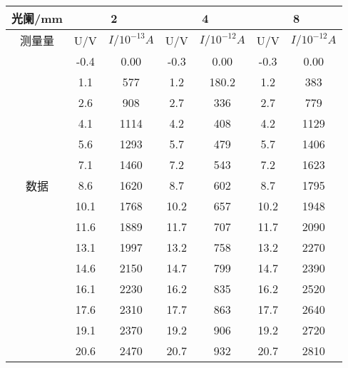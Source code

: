 \documentclass{article}
\begin{document}
\begin{table}[]
\centering
\caption{}
\label{tab:table2}
\begin{tabular}{@{}c|cc|cc|cc@{}}
\toprule
光阑/mm                & \multicolumn{2}{c|}{2} & \multicolumn{2}{c|}{4} & \multicolumn{2}{c}{8} \\ \midrule
测量量                  & U/V   & $I/10^{-13}A$ & U/V   & $I/10^{-12}A$  & U/V   & $I/10^{-12}A$  \\ \midrule
\multirow{13}{*}{数据} & -0.4  & 0.00          & -0.3  & 0.00           & -0.3  & 0.00           \\
                     & 1.1   & 577           & 1.2   & 180.2          & 1.2   & 383            \\
                     & 2.6   & 908           & 2.7   & 336            & 2.7   & 779            \\
                     & 4.1   & 1114          & 4.2   & 408            & 4.2   & 1129           \\
                     & 5.6   & 1293          & 5.7   & 479            & 5.7   & 1406           \\
                     & 7.1   & 1460          & 7.2   & 543            & 7.2   & 1623           \\
                     & 8.6   & 1620          & 8.7   & 602            & 8.7   & 1795           \\
                     & 10.1  & 1768          & 10.2  & 657            & 10.2  & 1948           \\
                     & 11.6  & 1889          & 11.7  & 707            & 11.7  & 2090           \\
                     & 13.1  & 1997          & 13.2  & 758            & 13.2  & 2270           \\
                     & 14.6  & 2150          & 14.7  & 799            & 14.7  & 2390           \\
                     & 16.1  & 2230          & 16.2  & 835            & 16.2  & 2520           \\
                     & 17.6  & 2310          & 17.7  & 863            & 17.7  & 2640           \\
                     & 19.1  & 2370          & 19.2  & 906            & 19.2  & 2720           \\
                     & 20.6  & 2470          & 20.7  & 932            & 20.7  & 2810           \\

\end{tabular}
\end{table}
\end{document}
